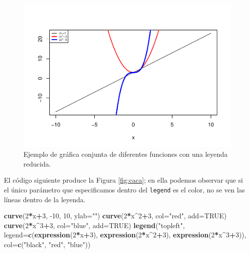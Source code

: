 \documentclass[
]{book}
\newenvironment{Shaded}{\begin{snugshade}}{\end{snugshade}}
\newcommand{\DataTypeTok}[1]{\textcolor[rgb]{0.13,0.29,0.53}{#1}}
\newcommand{\DecValTok}[1]{\textcolor[rgb]{0.00,0.00,0.81}{#1}}
\newcommand{\KeywordTok}[1]{\textcolor[rgb]{0.13,0.29,0.53}{\textbf{#1}}}
\newcommand{\NormalTok}[1]{#1}
\newcommand{\OperatorTok}[1]{\textcolor[rgb]{0.81,0.36,0.00}{\textbf{#1}}}
\newcommand{\OtherTok}[1]{\textcolor[rgb]{0.56,0.35,0.01}{#1}}
\newcommand{\StringTok}[1]{\textcolor[rgb]{0.31,0.60,0.02}{#1}}
\theoremstyle{definition}
\theoremstyle{definition}
\theoremstyle{definition}
\theoremstyle{remark}
\begin{document}
\begin{figure}

{\centering \includegraphics[width=0.9\linewidth]{07chap06_Graficos_I_files/figure-latex/mons22-1} 

}

\caption{Ejemplo de gráfica conjunta de diferentes funciones con una leyenda reducida.}\label{fig:mons22}
\end{figure}

El código siguiente produce la Figura \ref{fig:caca}; en ella podemos observar que si el único parámetro que especificamos dentro del \texttt{legend} es el color, no se ven las líneas dentro de la leyenda.

\begin{Shaded}
\begin{Highlighting}[]
\KeywordTok{curve}\NormalTok{(}\DecValTok{2}\OperatorTok{*}\NormalTok{x}\OperatorTok{+}\DecValTok{3}\NormalTok{, }\DecValTok{{-}10}\NormalTok{, }\DecValTok{10}\NormalTok{, }\DataTypeTok{ylab=}\StringTok{""}\NormalTok{)}
\KeywordTok{curve}\NormalTok{(}\DecValTok{2}\OperatorTok{*}\NormalTok{x}\OperatorTok{\^{}}\DecValTok{2}\OperatorTok{+}\DecValTok{3}\NormalTok{, }\DataTypeTok{col=}\StringTok{"red"}\NormalTok{, }\DataTypeTok{add=}\OtherTok{TRUE}\NormalTok{)}
\KeywordTok{curve}\NormalTok{(}\DecValTok{2}\OperatorTok{*}\NormalTok{x}\OperatorTok{\^{}}\DecValTok{3}\OperatorTok{+}\DecValTok{3}\NormalTok{, }\DataTypeTok{col=}\StringTok{"blue"}\NormalTok{, }\DataTypeTok{add=}\OtherTok{TRUE}\NormalTok{)}
\KeywordTok{legend}\NormalTok{(}\StringTok{"topleft"}\NormalTok{, }\DataTypeTok{legend=}\KeywordTok{c}\NormalTok{(}\KeywordTok{expression}\NormalTok{(}\DecValTok{2}\OperatorTok{*}\NormalTok{x}\OperatorTok{+}\DecValTok{3}\NormalTok{), }\KeywordTok{expression}\NormalTok{(}\DecValTok{2}\OperatorTok{*}\NormalTok{x}\OperatorTok{\^{}}\DecValTok{2}\OperatorTok{+}\DecValTok{3}\NormalTok{), }
                           \KeywordTok{expression}\NormalTok{(}\DecValTok{2}\OperatorTok{*}\NormalTok{x}\OperatorTok{\^{}}\DecValTok{3}\OperatorTok{+}\DecValTok{3}\NormalTok{)), }\DataTypeTok{col=}\KeywordTok{c}\NormalTok{(}\StringTok{"black"}\NormalTok{, }\StringTok{"red"}\NormalTok{, }\StringTok{"blue"}\NormalTok{))}
\end{Highlighting}
\end{Shaded}
\end{document}
